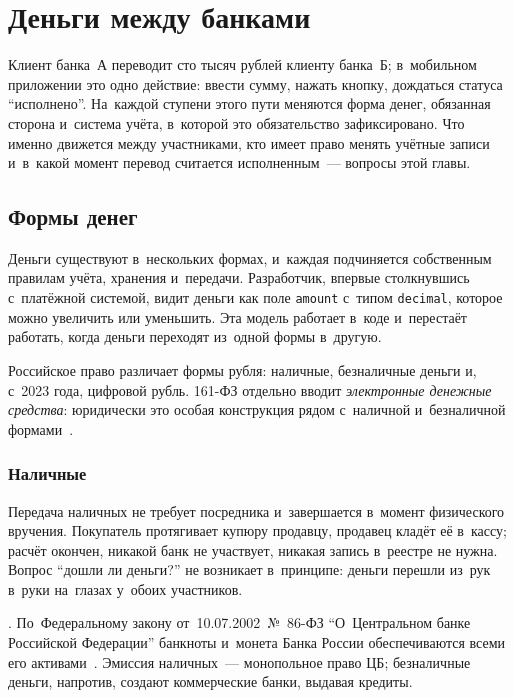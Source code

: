 \chapter{Деньги между банками}\label{ch:banks}

Клиент банка~А переводит сто тысяч рублей клиенту банка~Б; в~мобильном
приложении это одно действие: ввести сумму, нажать кнопку, дождаться статуса
\enquote{исполнено}. На~каждой ступени этого пути меняются форма денег,
обязанная сторона и~система учёта, в~которой это обязательство зафиксировано.
Что именно движется между участниками, кто имеет право менять учётные записи
и~в~какой момент перевод считается исполненным~--- вопросы этой главы.

\section{Формы денег}\label{sec:banks-forms-of-money}

Деньги существуют в~нескольких формах, и~каждая подчиняется собственным
правилам учёта, хранения и~передачи. Разработчик, впервые столкнувшись
с~платёжной системой, видит деньги как поле \texttt{amount} с~типом
\texttt{decimal}, которое можно увеличить или уменьшить. Эта модель работает
в~коде и~перестаёт работать, когда деньги переходят из~одной формы в~другую.

Российское право различает формы рубля: наличные, безналичные деньги
и, с~2023 года, цифровой рубль. 161-ФЗ отдельно вводит
\textit{электронные денежные средства}: юридически это особая конструкция рядом
с~наличной и~безналичной формами~\cite{fz-161}.

\subsection*{Наличные}

Передача наличных не требует посредника и~завершается в~момент физического
вручения. Покупатель протягивает купюру продавцу, продавец кладёт её в~кассу;
расчёт окончен, никакой банк не участвует, никакая запись в~реестре не нужна.
Вопрос \enquote{дошли ли деньги?} не возникает в~принципе: деньги перешли
из~рук в~руки на~глазах у~обоих участников.

.
По~Федеральному закону от~10.07.2002~№~86-ФЗ \enquote{О~Центральном банке
Российской Федерации} банкноты и~монета Банка России обеспечиваются всеми его
активами~\cite{fz-86}. Эмиссия наличных~--- монопольное право ЦБ; безналичные
деньги, напротив, создают коммерческие банки, выдавая кредиты.

